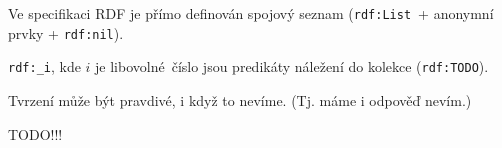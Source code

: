 \documentclass[12pt]{article}					%
\begin{document}
\begin{definice}
	Ve specifikaci RDF je přímo definován spojový seznam (\verb|rdf:List| + anonymní prvky + \verb|rdf:nil|).

	\verb|rdf:_i|, kde $i$ je libovolné číslo jsou predikáty náležení do kolekce (\verb|rdf:TODO|).
\end{definice}

\begin{definice}
	Tvrzení může být pravdivé, i když to nevíme. (Tj. máme i odpověď nevím.)
\end{definice}

TODO!!!
\end{document}
